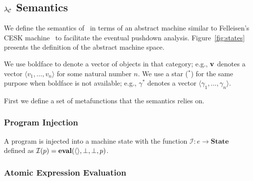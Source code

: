 \newcommand{\clo}[2]{\nttwo{clos}{#1}{#2}}
\newcommand{\imp}[2]{\ntthr{imp}{\ell}{#1}{#2}}
\newcommand{\cha}[2]{\ntthr{chap}{\ell}{#1}{#2}}

\newcommand{\letk}[3]{\mathrm{let}_\kappa(#1,#2,#3)}

\newcommand{\impcwk}[2]{\ntthr{imp\mhyphen neg}{\ell}{#1}{#2}}
\newcommand{\impcfk}[1]{\nttwo{imp\mhyphen fun}{\ell}{#1}}
\newcommand{\impcrk}[1]{\nttwo{imp\mhyphen pos}{\ell}{#1}}

\newcommand{\chacwk}[2]{\ntthr{chap\mhyphen neg}{\ell}{#1}{#2}}
\newcommand{\chacfk}[1]{\nttwo{chap\mhyphen fun}{\ell}{#1}}
\newcommand{\chacrk}[1]{\nttwo{chap\mhyphen pos}{\ell}{#1}}

\newcommand{\rr}{\longrightarrow}
\newcommand{\rrs}{\longrightarrow^{*}}



\subsection{$\lambda_{\mathcal{C}}$ Semantics}

We define the semantics of \chapcalc\ in terms of an abstract machine similar to Felleisen's CESK machine~\cite{felleisen1987calculus} to facilitate the eventual pushdown analysis.
Figure~\ref{fig:states} presents the definition of the abstract machine space.

We use boldface to denote a vector of objects in that category; e.g., $\mathbf{v}$ denotes a vector $\langle v_1,\dots,v_n\rangle$ for some natural number $n$.
We use a star ($^*$) for the same purpose when boldface is not available; e.g., $\gamma^*$ denotes a vector $\langle\gamma_1,\dots,\gamma_n\rangle$.

First we define a set of metafunctions that the semantics relies on.

\subsubsection{Program Injection}

A program is injected into a machine state with the function $\mathcal{I} : e\rightarrow\mathbf{State}$ defined as $\mathcal{I}(p)=\mathbf{eval}(\langle\rangle,\perp,\perp,p)$.

\subsubsection{Atomic Expression Evaluation}

\newcommand{\Aeval}[1]{\ensuremath{\mathcal{A}(\sigma,\rho,#1)}}

